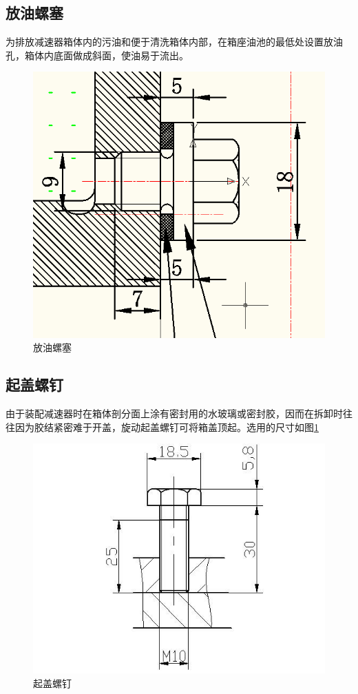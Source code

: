 \subsection{放油螺塞}
为排放减速器箱体内的污油和便于清洗箱体内部，在箱座油池的最低处设置放油孔，箱体内底面做成斜面，使油易于流出。
\begin{figure}[h]
    \centering
    \includegraphics[scale=0.45]{graphic/10-6.png}
    \caption{放油螺塞}
\end{figure}

\subsection{起盖螺钉}
由于装配减速器时在箱体剖分面上涂有密封用的水玻璃或密封胶，因而在拆卸时往往因为胶结紧密难于开盖，旋动起盖螺钉可将箱盖顶起。选用的尺寸如图\ref{img4}

\begin{figure}[h]
    \centering
    \includegraphics[scale=0.43]{graphic/10-4.jpg}
    \caption{起盖螺钉}
    \label{img4}
\end{figure}

